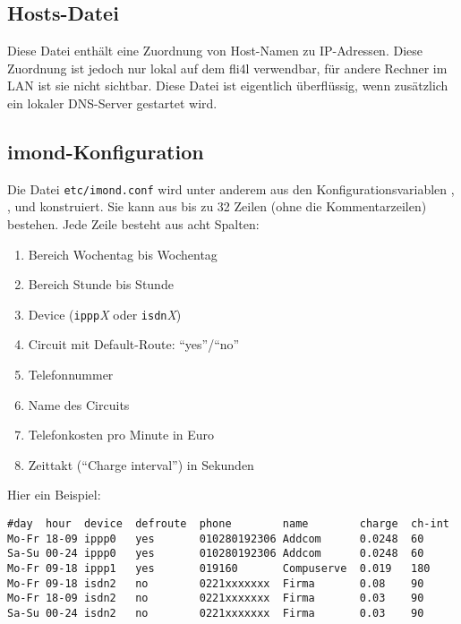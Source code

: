 \subsection{Hosts-Datei}

    Diese Datei enthält eine Zuordnung von Host-Namen zu IP-Adressen. Diese
    Zuordnung ist jedoch nur lokal auf dem fli4l verwendbar, für andere Rechner
    im LAN ist sie nicht sichtbar. Diese Datei ist eigentlich überflüssig, wenn
    zusätzlich ein lokaler DNS-Server gestartet wird.



\subsection{imond-Konfiguration}

Die Datei \texttt{etc/imond.conf} wird unter anderem aus den Konfigurationsvariablen
, , 
und  konstruiert. Sie kann aus bis zu 32 Zeilen
(ohne die Kommentarzeilen) bestehen. Jede Zeile besteht aus acht Spalten:

\begin{enumerate}
\item  Bereich Wochentag bis Wochentag
\item  Bereich Stunde bis Stunde
\item  Device (\texttt{ippp}\emph{X} oder \texttt{isdn}\emph{X})
\item  Circuit mit Default-Route: "`yes"'/"`no"'
\item  Telefonnummer
\item  Name des Circuits
\item  Telefonkosten pro Minute in Euro
\item  Zeittakt ("`Charge interval"') in Sekunden
\end{enumerate}

    Hier ein Beispiel:

\begin{example}
\begin{verbatim}
#day  hour  device  defroute  phone        name        charge  ch-int
Mo-Fr 18-09 ippp0   yes       010280192306 Addcom      0.0248  60
Sa-Su 00-24 ippp0   yes       010280192306 Addcom      0.0248  60
Mo-Fr 09-18 ippp1   yes       019160       Compuserve  0.019   180
Mo-Fr 09-18 isdn2   no        0221xxxxxxx  Firma       0.08    90
Mo-Fr 18-09 isdn2   no        0221xxxxxxx  Firma       0.03    90
Sa-Su 00-24 isdn2   no        0221xxxxxxx  Firma       0.03    90
\end{verbatim}
\end{example}

